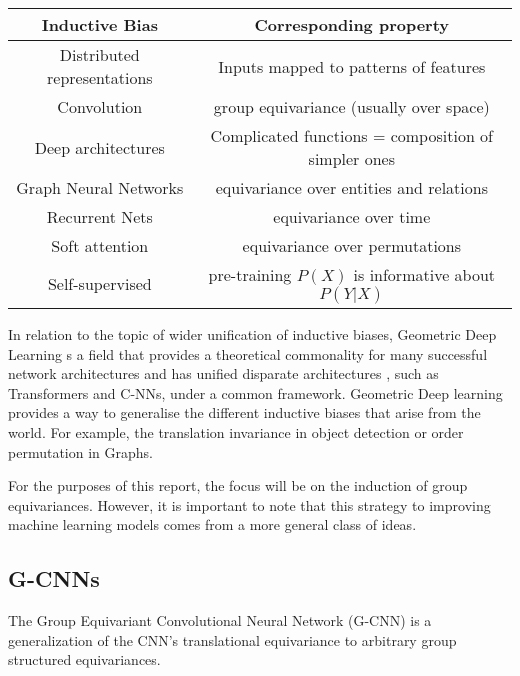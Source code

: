 \begin{table}
	\centering
	\begin{tabular}{|c | c|}
		\hline
		Inductive Bias              & Corresponding property                              \\
		\hline
		\hline
		Distributed representations & Inputs mapped to patterns of features               \\
		\hline
		Convolution                 & group equivariance (usually over space)             \\
		\hline
		Deep architectures          & Complicated functions = composition of simpler ones \\
		\hline
		Graph Neural Networks       & equivariance over entities and relations            \\
		\hline
		Recurrent Nets              & equivariance over time                              \\
		\hline
		Soft attention              & equivariance over permutations                      \\
		\hline
		Self-supervised             & pre-training $P(X)$ is informative about $P(Y |X)$  \\
		\hline
	\end{tabular}
\end{table}

In relation to the topic of wider unification of inductive biases, Geometric Deep Learning s a field that provides a theoretical commonality for many successful network architectures and has unified disparate architectures \cite{bronstein2021geometric}, such as Transformers and C-NNs, under a common framework. Geometric Deep learning provides a way to generalise the different inductive biases that arise from the world. For example, the translation invariance in object detection or order permutation in Graphs.

For the purposes of this report, the focus will be on the induction of group equivariances. However, it is important to note that this strategy to improving machine learning models comes from a more general class of ideas.


\subsection{G-CNNs}\label{sec:G-CNNs}

The Group Equivariant Convolutional Neural Network (G-CNN) is a generalization of the CNN's translational equivariance to arbitrary group structured equivariances.

